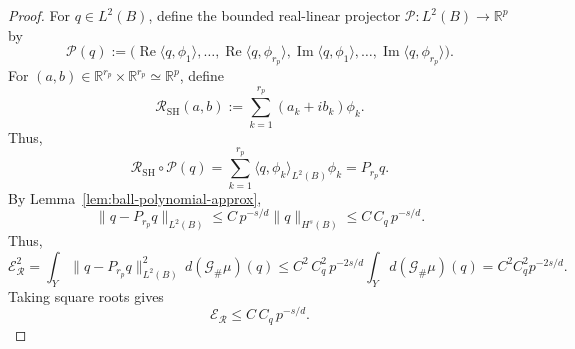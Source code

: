 \documentclass{article}
\numberwithin{equation}{section}
\theoremstyle{plain}
\begin{document}
	\begin{proof}
			For $q\in L^2(B)$, define the bounded real-linear
			projector $\mathcal P:L^2(B)\to\mathbb R^p$ by
			\begin{equation*}
				\mathcal P(q)
				:=
				\bigl(
				\operatorname{Re}\langle q,\phi_1\rangle,\dots,
				\operatorname{Re}\langle q,\phi_{r_p}\rangle,
				\operatorname{Im}\langle q,\phi_1\rangle,\dots,
				\operatorname{Im}\langle q,\phi_{r_p}\rangle
				\bigr).
			\end{equation*}
			For $(a,b)\in\mathbb R^{r_p}\times\mathbb R^{r_p}
			\simeq\mathbb R^p$, define
			\begin{equation*}
				\mathcal R_{\mathrm{SH}}(a,b)
				:=
				\sum_{k=1}^{r_p}(a_k+ib_k)\phi_k.
			\end{equation*}
			Thus,
			\begin{equation*}
				\mathcal R_{\mathrm{SH}}\circ\mathcal P(q)
				=
				\sum_{k=1}^{r_p}
				\langle q,\phi_k\rangle_{L^2(B)}\phi_k
				=
				P_{r_p}q.
			\end{equation*}
			By Lemma~\ref{lem:ball-polynomial-approx},
			\begin{equation*}
				\|q-P_{r_p}q\|_{L^2(B)}
				\le C\,p^{-s/d}\|q\|_{H^s(B)}
				\le C\, C_q\, p^{-s/d}.
			\end{equation*}
			Thus,
			\begin{equation*}
				\mathscr{E}_{\mathcal{R}}^2
				= \int_Y \|q-P_{r_p}q\|_{L^2(B)}^2
				\,d(\mathscr{G}_{\#}\mu)(q)
				\le C^2\, C_q^2\, p^{-2s/d}\int_Y d(\mathscr{G}_{\#}\mu)(q)
				= C^2 C_q^2 p^{-2s/d}.
			\end{equation*}
			Taking square roots gives
			\begin{equation*}
				\mathscr{E}_{\mathcal{R}} \le C\, C_q\, p^{-s/d}.
			\end{equation*}
			
	\end{proof}
	
\end{document}
